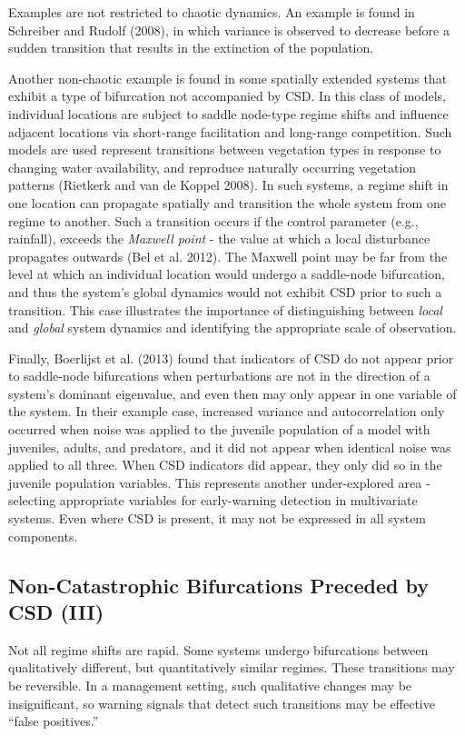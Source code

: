 \documentclass{article}
\begin{document}
Examples are not restricted to chaotic dynamics. An example is found in
Schreiber and Rudolf (2008), in which variance is observed to decrease
before a sudden transition that results in the extinction of the
population.

Another non-chaotic example is found in some spatially extended systems
that exhibit a type of bifurcation not accompanied by CSD. In this class
of models, individual locations are subject to saddle node-type regime
shifts and influence adjacent locations via short-range facilitation and
long-range competition. Such models are used represent transitions
between vegetation types in response to changing water availability, and
reproduce naturally occurring vegetation patterns (Rietkerk and van de
Koppel 2008). In such systems, a regime shift in one location can
propagate spatially and transition the whole system from one regime to
another. Such a transition occurs if the control parameter (e.g.,
rainfall), exceeds the \emph{Maxwell point} - the value at which a local
disturbance propagates outwards (Bel et al. 2012). The Maxwell point may
be far from the level at which an individual location would undergo a
saddle-node bifurcation, and thus the system's global dynamics would not
exhibit CSD prior to such a transition. This case illustrates the
importance of distinguishing between \emph{local} and \emph{global}
system dynamics and identifying the appropriate scale of observation.

Finally, Boerlijst et al. (2013) found that indicators of CSD do not
appear prior to saddle-node bifurcations when perturbations are not in
the direction of a system's dominant eigenvalue, and even then may only
appear in one variable of the system. In their example case, increased
variance and autocorrelation only occurred when noise was applied to the
juvenile population of a model with juveniles, adults, and predators,
and it did not appear when identical noise was applied to all three.
When CSD indicators did appear, they only did so in the juvenile
population variables. This represents another under-explored area -
selecting appropriate variables for early-warning detection in
multivariate systems. Even where CSD is present, it may not be expressed
in all system components.

\subsection{Non-Catastrophic Bifurcations Preceded by CSD (III)}

Not all regime shifts are rapid. Some systems undergo bifurcations
between qualitatively different, but quantitatively similar regimes.
These transitions may be reversible. In a management setting, such
qualitative changes may be insignificant, so warning signals that detect
such transitions may be effective ``false positives.''
\end{document}
